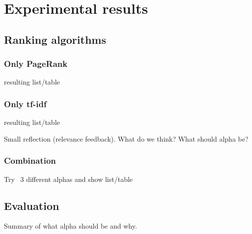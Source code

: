 \section{Experimental results}

\subsection{Ranking algorithms}

\subsubsection{Only PageRank}
resulting list/table

\subsubsection{Only tf-idf}
resulting list/table

Small reflection (relevance feedback). What do we think? What should alpha be?
\subsubsection{Combination}
Try ~3 different alphas and show list/table

\subsection{Evaluation}
Summary of what alpha should be and why.
